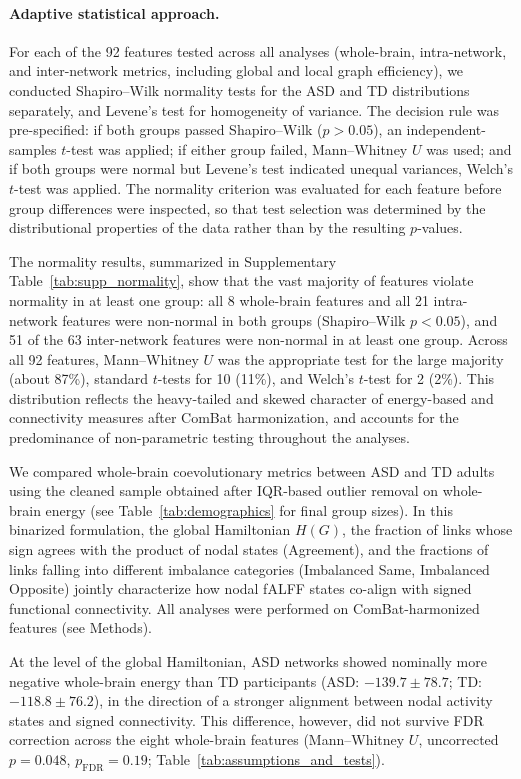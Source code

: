 \documentclass[10pt,letterpaper]{article}
\begin{document}
\paragraph*{Adaptive statistical approach.}
For each of the 92 features tested across all analyses (whole-brain, intra-network, and inter-network
metrics, including global and local graph efficiency), we conducted Shapiro--Wilk normality tests
for the ASD and TD distributions separately, and Levene's test for homogeneity of variance. The
decision rule was pre-specified: if both groups passed Shapiro--Wilk ($p > 0.05$), an
independent-samples $t$-test was applied; if either group failed, Mann--Whitney $U$ was used; and
if both groups were normal but Levene's test indicated unequal variances, Welch's $t$-test was
applied. The normality criterion was evaluated for each feature before group differences were
inspected, so that test selection was determined by the distributional properties of the data rather
than by the resulting $p$-values.

The normality results, summarized in Supplementary Table~\ref{tab:supp_normality}, show that the
vast majority of features violate normality in at least one group: all 8 whole-brain features and
all 21 intra-network features were non-normal in both groups (Shapiro--Wilk $p < 0.05$), and 51
of the 63 inter-network features were non-normal in at least one group. Across all 92 features,
Mann--Whitney $U$ was the appropriate test for the large majority (about 87\%), standard $t$-tests for 10 (11\%), and
Welch's $t$-test for 2 (2\%). This distribution reflects the heavy-tailed and skewed character of
energy-based and connectivity measures after ComBat harmonization, and accounts for the
predominance of non-parametric testing throughout the analyses.

We compared whole-brain coevolutionary metrics between ASD and TD adults using the cleaned sample
obtained after IQR-based outlier removal on whole-brain energy (see Table~\ref{tab:demographics}
for final group sizes). In this binarized formulation, the global Hamiltonian $H(G)$, the fraction
of links whose sign agrees with the product of nodal states (Agreement), and the fractions of links
falling into different imbalance categories (Imbalanced Same, Imbalanced Opposite) jointly
characterize how nodal fALFF states co-align with signed functional connectivity. All analyses were
performed on ComBat-harmonized features (see Methods).

At the level of the global Hamiltonian, ASD networks showed nominally more negative whole-brain
energy than TD participants (ASD: $-139.7 \pm 78.7$; TD: $-118.8 \pm 76.2$), in the direction of a
stronger alignment between nodal activity states and signed connectivity. This difference, however,
did not survive FDR correction across the eight whole-brain features (Mann--Whitney $U$, uncorrected
$p = 0.048$, $p_{\mathrm{FDR}} = 0.19$; Table~\ref{tab:assumptions_and_tests}).
\end{document}
